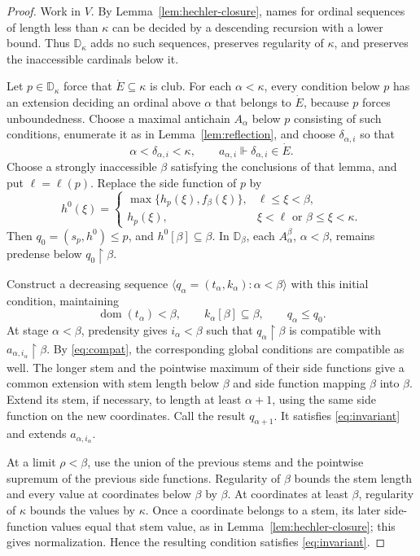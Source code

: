 \documentclass[10pt,a4paper]{amsart}
\theoremstyle{definition}
\theoremstyle{remark}
\newcommand{\D}{\mathbb D}
\DeclareMathOperator{\dom}{dom}
\begin{document}
\begin{proof}
Work in \(V\). By Lemma~\ref{lem:hechler-closure}, names for
ordinal sequences of length less than \(\kappa\) can be decided
by a descending recursion with a lower bound. Thus \(\D_\kappa\)
adds no such sequences, preserves regularity of \(\kappa\), and
preserves the inaccessible cardinals below it.

Let \(p\in\D_\kappa\) force that \(\dot E\subseteq\kappa\)
is club. For each \(\alpha<\kappa\), every condition below
\(p\) has an extension deciding an ordinal above \(\alpha\)
that belongs to \(\dot E\), because \(p\) forces unboundedness.
Choose a maximal antichain
\(A_\alpha\) below \(p\) consisting of such conditions, enumerate
it as in Lemma~\ref{lem:reflection}, and choose
\(\delta_{\alpha,i}\) so that
\[
 \alpha<\delta_{\alpha,i}<\kappa,\qquad
 a_{\alpha,i}\Vdash\delta_{\alpha,i}\in\dot E.
\]
Choose a strongly inaccessible \(\beta\) satisfying the conclusions
of that lemma, and put \(\ell=\ell(p)\). Replace the side function
of \(p\) by
\[
 h^0(\xi)=
 \begin{cases}
 \max\{h_p(\xi),f_\beta(\xi)\},&\ell\leq\xi<\beta,\\
 h_p(\xi),&\xi<\ell\text{ or }\beta\leq\xi<\kappa.
 \end{cases}
\]
Then \(q_0=(s_p,h^0)\leq p\), and
\(h^0[\beta]\subseteq\beta\). In \(\D_\beta\), each
\(A_\alpha^\beta\), \(\alpha<\beta\), remains predense below
\(q_0\restriction\beta\).

Construct a decreasing sequence
\(\langle q_\alpha=(t_\alpha,k_\alpha):\alpha<\beta\rangle\)
with this initial condition, maintaining
\begin{equation}\label{eq:invariant}
 \dom(t_\alpha)<\beta,\qquad
 k_\alpha[\beta]\subseteq\beta,\qquad q_\alpha\leq q_0.
\end{equation}
At stage \(\alpha<\beta\), predensity gives \(i_\alpha<\beta\)
such that \(q_\alpha\restriction\beta\) is compatible with
\(a_{\alpha,i_\alpha}\restriction\beta\). By
\eqref{eq:compat}, the corresponding global conditions are
compatible as well. The longer stem and the pointwise maximum of their
side functions give a common extension with stem length below
\(\beta\) and side function mapping \(\beta\) into \(\beta\).
Extend its stem, if necessary, to
length at least \(\alpha+1\), using the same side function on
the new coordinates. Call the result \(q_{\alpha+1}\). It
satisfies \eqref{eq:invariant} and extends
\(a_{\alpha,i_\alpha}\).

At a limit \(\rho<\beta\), use the union of the previous stems
and the pointwise supremum of the previous side functions.
Regularity of \(\beta\) bounds the stem length and every value at
coordinates below \(\beta\) by \(\beta\). At coordinates at
least \(\beta\), regularity of \(\kappa\) bounds the values by
\(\kappa\). Once a coordinate belongs to a stem, its later
side-function values equal that stem value, as in
Lemma~\ref{lem:hechler-closure}; this gives normalization.
Hence the resulting condition satisfies \eqref{eq:invariant}.


\end{proof}
\end{document}
